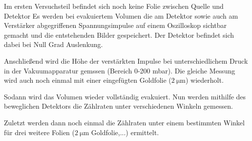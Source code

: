 Im ersten Versuchsteil befindet sich noch keine Folie zwischen Quelle und Detektor
Es werden bei evakuiertem Volumen die am Detektor sowie auch am Verstärker
abgegriffenen  Spannungsimpulse auf einem Oszilloskop sichtbar gemacht und die
entstehenden Bilder gespeichert. Der Detektor befindet sich dabei bei Null Grad Auslenkung.

Anschließend wird die Höhe der verstärkten Impulse bei unterschiedlichem Druck
in der Vakuumapparatur gemssen (Bereich 0-200 mbar). Die gleiche Messung wird auch
noch einmal mit einer eingefügten Goldfolie ($\SI{2}{\micro\meter}$) wiederholt.

Sodann wird das Volumen wieder vollständig evakuiert. Nun werden
mithilfe des beweglichen Detektors die Zählraten unter verschiedenen Winkeln gemessen.

Zuletzt werden dann noch einmal die Zählraten unter einem bestimmten Winkel für
drei weitere Folien ($\SI{2}{\micro\meter}$ Goldfolie,...) ermittelt.
